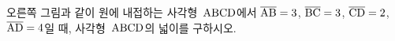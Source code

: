\noindent\begin{minipage}[t]{0.58\linewidth}\vspace{0pt}\raggedright 오른쪽 그림과 같이 원에 내접하는 사각형~$\mathrm{ABCD}$에서 $\overline{\mathrm{AB}}=3$, $\overline{\mathrm{BC}}=3$, $\overline{\mathrm{CD}}=2$, $\overline{\mathrm{AD}}=4$일 때, 사각형~$\mathrm{ABCD}$의 넓이를 구하시오.\end{minipage}\hfill\begin{minipage}[t]{0.4\linewidth}\vspace{0pt}\centering \resizebox{\ifdim\width>\linewidth\linewidth\else\width\fi}{!}{}\end{minipage}\par
